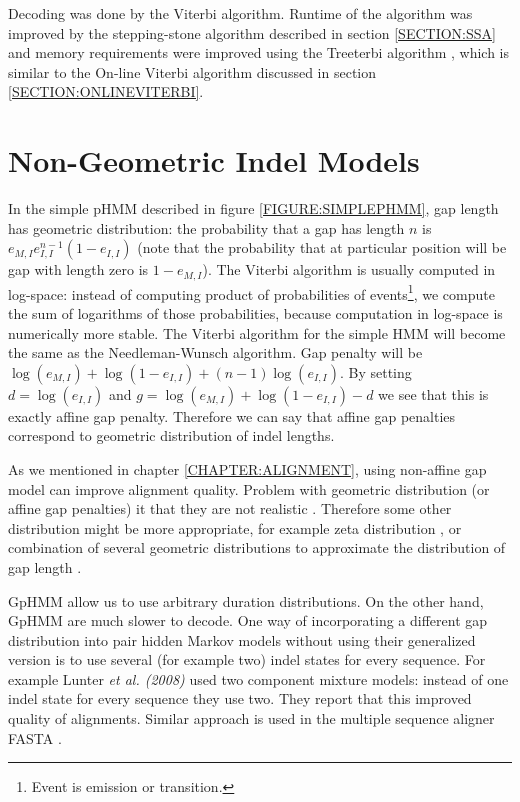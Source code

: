 Decoding was done by the Viterbi algorithm. Runtime of the algorithm was
improved by the stepping-stone algorithm described in section \ref{SECTION:SSA}
and memory requirements were improved using the Treeterbi algorithm
\cite{Keibler2007}, which is similar to the On-line Viterbi algorithm discussed
in section \ref{SECTION:ONLINEVITERBI}.


\section{Non-Geometric Indel Models}
In the simple pHMM described in figure \ref{FIGURE:SIMPLEPHMM}, gap length has
geometric distribution: the probability that a gap has length $n$ is
$e_{M,I}e_{I,I}^{n-1}(1-e_{I,I})$ (note that the probability that at particular
position will be gap with length zero is $1-e_{M,I}$). The Viterbi
algorithm is usually computed in log-space: instead of computing product of
probabilities of events\footnote{Event is emission or transition.}, we compute
the sum of logarithms of those probabilities, because computation in log-space
is numerically more stable. The Viterbi algorithm for the simple HMM
will become the same as the Needleman-Wunsch algorithm.  Gap penalty will be
$\log(e_{M,I})+\log(1-e_{I,I})+(n-1)\log(e_{I,I})$. By setting $d=\log(e_{I,I})$
and $g=\log(e_{M,I})+\log(1-e_{I,I})-d$ we see that this is exactly affine gap
penalty. Therefore we can say that affine gap penalties correspond to geometric
distribution of indel lengths.

As we mentioned in chapter \ref{CHAPTER:ALIGNMENT}, using non-affine gap model
can improve alignment quality.  Problem with geometric distribution (or affine
gap penalties) it that they are not realistic \cite{Cartwright2009,Lunter2008}.
Therefore some other distribution might be more appropriate, for example zeta
distribution \cite{Cartwright2009}, or combination of several geometric
distributions to approximate the distribution of gap length
\cite{Gill2004,Gill2006}.

GpHMM allow us to use arbitrary duration distributions.  On the other hand,
GpHMM are much slower to decode.  One way of incorporating a different gap
distribution into pair hidden Markov models without using their generalized
version is to use several (for example two) indel states for every sequence. For
example Lunter {\it et al. (2008)} used two component mixture models: instead of
one indel state for every sequence they use two. They report that this improved
quality of alignments. Similar approach is used in the multiple sequence aligner
FASTA \cite{Bradley2009}. \nocite{Lunter2008}

